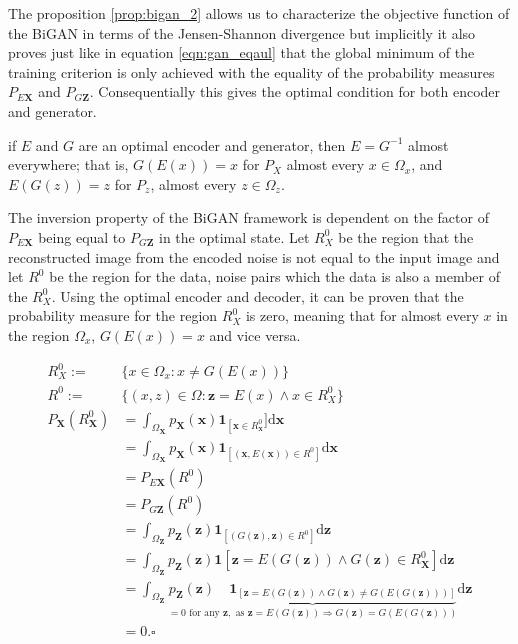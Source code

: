 The proposition \ref{prop:bigan_2} allows us to characterize the objective function of the BiGAN in
terms of the Jensen-Shannon divergence but implicitly it also proves just like in equation
\ref{eqn:gan_eqaul} that the global minimum of the training criterion is only achieved with the
equality of the probability measures $P_{E\mathbf{X}}$ and $P_{G\mathbf{Z}}$. Consequentially this
gives the optimal condition for both encoder and generator. 

\begin{theorem}
    \label{th:bigan_inv}
    if $E$ and $G$ are an optimal encoder and generator, then $E = G^{-1}$ almost everywhere; that is,
    $G(E(x)) = x$ for $P_X$ almost every $x \in \Omega_x$, and $E(G(z)) = z$ for $P_z$, almost every
    $z \in \Omega_z$. \cite{Donahue2017AdversarialFL}
\end{theorem}

The inversion property of the BiGAN framework is dependent on the factor of $P_{E\mathbf{X}}$ being
equal to $P_{G\mathbf{Z}}$ in the optimal state. Let $R_{X}^{0}$ be the region that the
reconstructed image from the encoded noise is not equal to the input image and let $R^{0}$ be the
region for the data, noise pairs which the data is also a member of the $R^{0}_{X}$. Using the
optimal encoder and decoder, it can be proven that the probability measure for the region
$R^{0}_{X}$ is zero, meaning that for almost every $x$ in the region $\Omega_x$, $G(E(x)) = x$ and
vice versa.


\begin{align}
    R^{0}_{X} :=& \{x \in \Omega_x : x \neq G(E(x))\} \\[5pt]
    R^{0} :=& \{(x,z) \in \Omega : \mathbf{z} = E(x) \land x \in R^{0}_{X}\}\\[5pt]
    P_{\mathbf{X}}\left(R_{\mathbf{X}}^{0}\right) &=\int_{\Omega_{\mathbf{X}}} p_{\mathbf{X}}(\mathbf{x}) \mathbf{1}_{\left[\mathbf{x} \in R_{\mathbf{x}}^{0}\right.} ] \mathrm{d} \mathbf{x} \\[5pt]
    &=\int_{\Omega_{\mathbf{X}}} p_{\mathbf{X}}(\mathbf{x}) \mathbf{1}_{\left[(\mathbf{x}, E(\mathbf{x})) \in R^{0}\right]} \mathrm{d} \mathbf{x} \\[5pt]
    & =P_{E \mathbf{X}}\left(R^{0}\right)\\[5pt]
    & =P_{G \mathbf{Z}}\left(R^{0}\right)\\[5pt]
    & =\int_{\Omega_{\mathbf{Z}}} p_{\mathbf{Z}}(\mathbf{z}) \mathbf{1}_{\left[(G(\mathbf{z}), \mathbf{z}) \in R^{0}\right]} \mathrm{d} \mathbf{z}\\[5pt]
    & =\int_{\Omega_{\mathbf{Z}}} p_{\mathbf{Z}}(\mathbf{z}) \mathbf{1}\left[\mathbf{z}=E(G(\mathbf{z})) \wedge G(\mathbf{z}) \in R_{\mathbf{X}}^{0}\right] \mathrm{d} \mathbf{z}\\[5pt]
    & =\int_{\Omega_{\mathbf{Z}}} \underbrace{p_{\mathbf{Z}}(\mathbf{z}) \quad \mathbf{1}_{[\mathbf{z}=E(G(\mathbf{z})) \wedge G(\mathbf{z}) \neq G(E(G(\mathbf{z})))]}}_{=0 \text { for any } \mathbf{z}, \text { as } \mathbf{z}=E(G(\mathbf{z})) \Longrightarrow G(\mathbf{z})=G(E(G(\mathbf{z})))} \mathrm{d} \mathbf{z}\\[5pt]
    &= 0. \square  \\[5pt]
\end{align}

